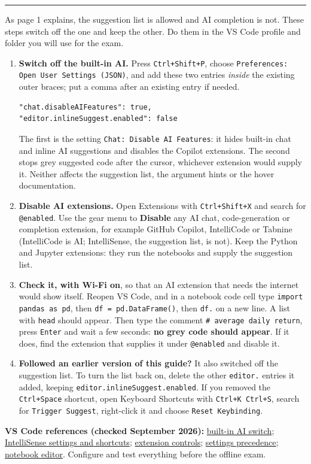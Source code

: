\documentclass[10pt,a4paper]{article}
\newcommand{\sectionhead}[1]{\Needspace{5\baselineskip}\vspace{4pt}{\large\bfseries\color{accent}#1}\par\vspace{1pt}\hrule\vspace{3pt}}
\begin{document}
\newpage
\sectionhead{VS Code: switch off AI completion, keep the suggestion list}
As page 1 explains, the suggestion list is allowed and AI completion is not. These steps switch off the one and keep the other. Do them in the VS Code profile and folder you will use for the exam.
\begin{enumerate}
\item \textbf{Switch off the built-in AI.} Press \texttt{Ctrl+Shift+P}, choose \texttt{Preferences: Open User Settings (JSON)}, and add these two entries \emph{inside} the existing outer braces; put a comma after an existing entry if needed.
\begin{lstlisting}[style=vscode]
"chat.disableAIFeatures": true,
"editor.inlineSuggest.enabled": false
\end{lstlisting}
The first is the setting \texttt{Chat: Disable AI Features}: it hides built-in chat and inline AI suggestions and disables the Copilot extensions. The second stops grey suggested code after the cursor, whichever extension would supply it. Neither affects the suggestion list, the argument hints or the hover documentation.
\item \textbf{Disable AI extensions.} Open Extensions with \texttt{Ctrl+Shift+X} and search for \texttt{@enabled}. Use the gear menu to \textbf{Disable} any AI chat, code-generation or completion extension, for example GitHub Copilot, IntelliCode or Tabnine (IntelliCode is AI; IntelliSense, the suggestion list, is not). Keep the Python and Jupyter extensions: they run the notebooks and supply the suggestion list.
\item \textbf{Check it, with Wi-Fi on}, so that an AI extension that needs the internet would show itself. Reopen VS Code, and in a notebook code cell type \mbox{\texttt{import pandas as pd}}, then \mbox{\texttt{df = pd.DataFrame()}}, then \texttt{df.} on a new line. A list with \texttt{head} should appear. Then type the comment \texttt{\# average daily return}, press \texttt{Enter} and wait a few seconds: \textbf{no grey code should appear}. If it does, find the extension that supplies it under \texttt{@enabled} and disable it.
\item \textbf{Followed an earlier version of this guide?} It also switched off the suggestion list. To turn the list back on, delete the other \texttt{editor.} entries it added, keeping \texttt{editor.inlineSuggest.enabled}. If you removed the \texttt{Ctrl+Space} shortcut, open Keyboard Shortcuts with \texttt{Ctrl+K Ctrl+S}, search for \texttt{Trigger Suggest}, right-click it and choose \texttt{Reset Keybinding}.
\end{enumerate}
{\footnotesize\color{ink}\textbf{VS Code references (checked September 2026):} \href{https://code.visualstudio.com/docs/setup/copilot}{built-in AI switch}; \href{https://code.visualstudio.com/docs/editing/intellisense}{IntelliSense settings and shortcuts}; \href{https://code.visualstudio.com/docs/configure/extensions/extension-marketplace}{extension controls}; \href{https://code.visualstudio.com/docs/configure/settings}{settings precedence}; \href{https://code.visualstudio.com/docs/datascience/jupyter-notebooks}{notebook editor}. Configure and test everything before the offline exam.}
\end{document}
